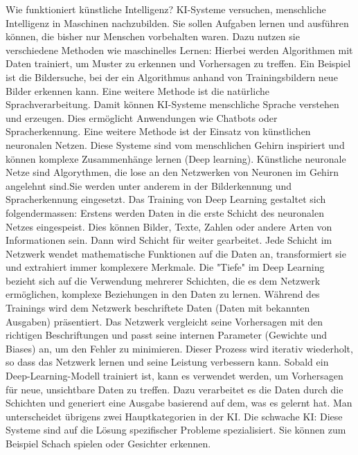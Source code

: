 \documentclass{article}
\begin{document}
Wie funktioniert künstliche Intelligenz? KI-Systeme versuchen, menschliche Intelligenz in Maschinen nachzubilden. Sie sollen Aufgaben lernen und ausführen können, die bisher nur Menschen vorbehalten waren. Dazu nutzen sie verschiedene Methoden wie maschinelles Lernen: Hierbei werden Algorithmen mit Daten trainiert, um Muster zu erkennen und Vorhersagen zu treffen. Ein Beispiel ist die Bildersuche, bei der ein Algorithmus anhand von Trainingsbildern neue Bilder erkennen kann. Eine weitere Methode ist die natürliche Sprachverarbeitung. Damit können KI-Systeme menschliche Sprache verstehen und erzeugen. Dies ermöglicht Anwendungen wie Chatbots oder Spracherkennung. Eine weitere Methode ist der Einsatz von künstlichen neuronalen Netzen. Diese Systeme sind vom menschlichen Gehirn inspiriert und können komplexe Zusammenhänge lernen (Deep learning). Künstliche neuronale Netze sind Algorythmen, die lose an den Netzwerken von Neuronen im Gehirn angelehnt sind.Sie werden unter anderem in der Bilderkennung und Spracherkennung eingesetzt. Das Training von Deep Learning gestaltet sich folgendermassen: Erstens werden Daten  in die erste Schicht des neuronalen Netzes eingespeist. Dies können Bilder, Texte, Zahlen oder andere Arten von Informationen sein. Dann wird Schicht für weiter gearbeitet. Jede Schicht im Netzwerk wendet mathematische Funktionen auf die Daten an, transformiert sie und extrahiert immer komplexere Merkmale. Die "Tiefe" im Deep Learning bezieht sich auf die Verwendung mehrerer Schichten, die es dem Netzwerk ermöglichen, komplexe Beziehungen in den Daten zu lernen. Während des Trainings wird dem Netzwerk beschriftete Daten (Daten mit bekannten Ausgaben) präsentiert. Das Netzwerk vergleicht seine Vorhersagen mit den richtigen Beschriftungen und passt seine internen Parameter (Gewichte und Biases) an, um den Fehler zu minimieren. Dieser Prozess wird iterativ wiederholt, so dass das Netzwerk lernen und seine Leistung verbessern kann. Sobald ein Deep-Learning-Modell trainiert ist, kann es verwendet werden, um Vorhersagen für neue, unsichtbare Daten zu treffen. Dazu verarbeitet es die Daten durch die Schichten und generiert eine Ausgabe basierend auf dem, was es gelernt hat.
Man unterscheidet übrigens zwei Hauptkategorien in der KI. Die schwache KI: Diese Systeme sind auf die Lösung spezifischer Probleme spezialisiert. Sie können zum Beispiel Schach spielen oder Gesichter erkennen. 
\end{document}
